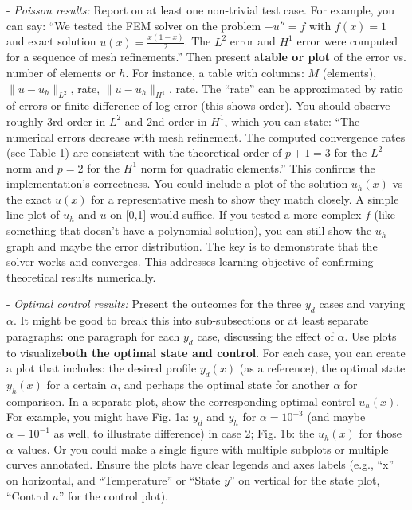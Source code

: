 \documentclass[a4paper,10pt]{article}
\begin{document}
- \emph{Poisson results:} Report on at least one non-trivial test case. For example, you can say: “We tested the FEM solver on the problem \(-u''=f\) with \(f(x)=1\) and exact solution \(u(x)=\frac{x(1-x)}{2}\). The \(L^2\) error and \(H^1\) error were computed for a sequence of mesh refinements.” Then present a\textbf{table or plot} of the error vs. number of elements or \(h\). For instance, a table with columns: \(M\) (elements), \(\|u-u_h\|_{L^2}\), rate, \(\|u-u_h\|_{H^1}\), rate. The “rate” can be approximated by ratio of errors or finite difference of log error (this shows order). You should observe roughly 3rd order in \(L^2\) and 2nd order in \(H^1\), which you can state: “The numerical errors decrease with mesh refinement. The computed convergence rates (see Table 1) are consistent with the theoretical order of \(p+1=3\) for the \(L^2\) norm and \(p=2\) for the \(H^1\) norm for quadratic elements.” This confirms the implementation's correctness. You could include a plot of the solution \(u_h(x)\) vs the exact \(u(x)\) for a representative mesh to show they match closely. A simple line plot of \(u_h\) and \(u\) on [0,1] would suffice. If you tested a more complex \(f\) (like something that doesn't have a polynomial solution), you can still show the \(u_h\) graph and maybe the error distribution. The key is to demonstrate that the solver works and converges. This addresses learning objective of confirming theoretical results numerically.

- \emph{Optimal control results:} Present the outcomes for the three \(y_d\) cases and varying \(\alpha\). It might be good to break this into sub-subsections or at least separate paragraphs: one paragraph for each \(y_d\) case, discussing the effect of \(\alpha\). Use plots to visualize\textbf{both the optimal state and control}. For each case, you can create a plot that includes: the desired profile \(y_d(x)\) (as a reference), the optimal state \(y_h(x)\) for a certain \(\alpha\), and perhaps the optimal state for another \(\alpha\) for comparison. In a separate plot, show the corresponding optimal control \(u_h(x)\). For example, you might have Fig. 1a: \(y_d\) and \(y_h\) for \(\alpha=10^{-3}\) (and maybe \(\alpha=10^{-1}\) as well, to illustrate difference) in case 2; Fig. 1b: the \(u_h(x)\) for those \(\alpha\) values. Or you could make a single figure with multiple subplots or multiple curves annotated. Ensure the plots have clear legends and axes labels (e.g., “x” on horizontal, and “Temperature” or “State \(y\)” on vertical for the state plot, “Control \(u\)” for the control plot).
\end{document}
